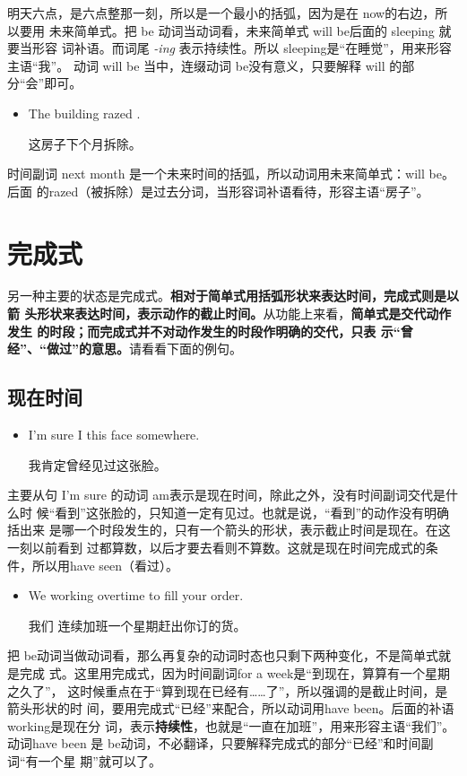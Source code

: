 明天六点，是六点整那一刻，所以是一个最小的括弧，因为是在 now的右边，所以要用
未来简单式。把 be 动词当动词看，未来简单式 will be后面的 sleeping 就要当形容
词补语。而词尾 \emph{-ing} 表示持续性。所以 sleeping是“在睡觉”，用来形容主语“我”。
动词 will be 当中，连缀动词 be没有意义，只要解释 will 的部分“会”即可。

\begin{itemize}
\item  The building  razed .

  这房子下个月拆除。
\end{itemize}

时间副词 next month 是一个未来时间的括弧，所以动词用未来简单式：will be。后面
的razed（被拆除）是过去分词，当形容词补语看待，形容主语“房子”。

\section{完成式}

另一种主要的状态是完成式。\textbf{相对于简单式用括弧形状来表达时间，完成式则是以箭
  头形状来表达时间，表示动作的截止时间。}从功能上来看，\textbf{简单式是交代动作发生
  的时段；而完成式并不对动作发生的时段作明确的交代，只表
  示“曾经”、“做过”的意思。}请看看下面的例句。

\subsection{现在时间}
\begin{itemize}
\item  I'm sure I  this face somewhere.

  我肯定曾经见过这张脸。
\end{itemize}

主要从句 I'm sure 的动词 am表示是现在时间，除此之外，没有时间副词交代是什么时
候“看到”这张脸的，只知道一定有见过。也就是说，“看到”的动作没有明确括出来
是哪一个时段发生的，只有一个箭头的形状，表示截止时间是现在。在这一刻以前看到
过都算数，以后才要去看则不算数。这就是现在时间完成式的条件，所以用have
seen（看过）。

\begin{itemize}
\item We  working overtime  to fill your order.

我们
  连续加班一个星期赶出你订的货。
\end{itemize}

把 be动词当做动词看，那么再复杂的动词时态也只剩下两种变化，不是简单式就是完成
式。这里用完成式，因为时间副词for a week是“到现在，算算有一个星期之久了”，
这时候重点在于“算到现在已经有……了”，所以强调的是截止时间，是箭头形状的时
间，要用完成式“已经”来配合，所以动词用have been。后面的补语 working是现在分
词，表示\textbf{持续性}，也就是“一直在加班”，用来形容主语“我们”。动词have
been 是 be动词，不必翻译，只要解释完成式的部分“已经”和时间副词“有一个星
期”就可以了。

